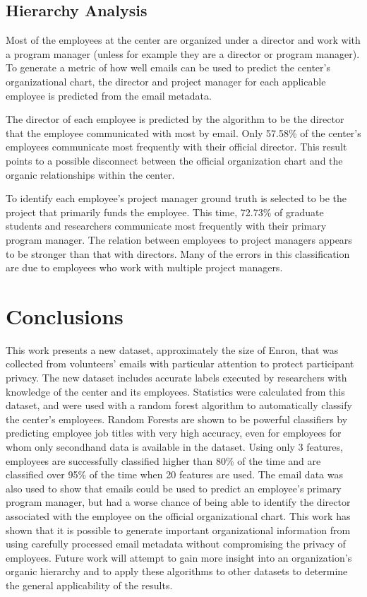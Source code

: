 \documentclass[12pt]{report}
\begin{document}
\section{Hierarchy Analysis}
Most of the employees at the center are organized under a director and work with a program manager (unless for example they are a director or program manager).
To generate a metric of how well emails can be used to predict the center's organizational chart, the director and project manager for each applicable employee is predicted from the email metadata. 

The director of each employee is predicted by the algorithm to be the director that the employee communicated with most by email.
Only 57.58\% of the center's employees communicate most frequently with their official director.
This result points to a possible disconnect between the official organization chart and the organic relationships within the center.

To identify each employee's project manager ground truth is selected to be the project that primarily funds the employee.
This time, 72.73\% of graduate students and researchers communicate most frequently with their primary program manager.
The relation between employees to project managers appears to be stronger than that with directors.
Many of the errors in this classification are due to employees who work with multiple project managers.  

\chapter{Conclusions} \label{Conclusions}
This work presents a new dataset, approximately the size of Enron, that was collected from volunteers' emails with particular attention to protect participant privacy.
The new dataset includes accurate labels executed by researchers with knowledge of the center and its employees.
Statistics were calculated from this dataset, and were used with a random forest algorithm to automatically classify the center's employees.
Random Forests are shown to be powerful classifiers by predicting employee job titles with very high accuracy, even for employees for whom only secondhand data is available in the dataset.
Using only 3 features, employees are successfully classified higher than 80\% of the time and are classified over 95\% of the time when 20 features are used.
The email data was also used to show that emails could be used to predict an employee's primary program manager, but had a worse chance of being able to identify the director associated with the employee on the official organizational chart.
This work has shown that it is possible to generate important organizational information from using carefully processed email metadata without compromising the privacy of employees.
Future work will attempt to gain more insight into an organization's organic hierarchy and to apply these algorithms to other datasets to determine the general applicability of the results.
\end{document}

